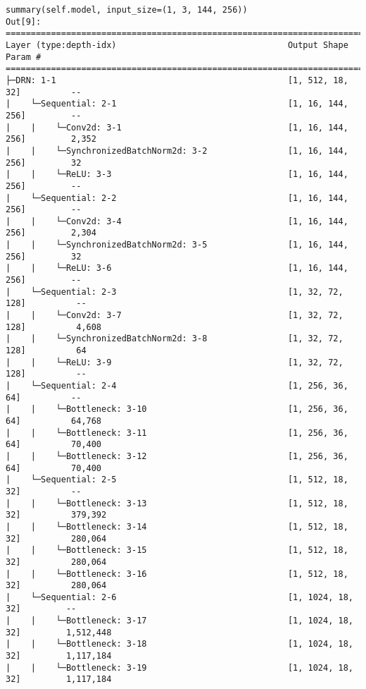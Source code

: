 \begin{verbatim}
summary(self.model, input_size=(1, 3, 144, 256))
Out[9]: 
=========================================================================================================
Layer (type:depth-idx)                                  Output Shape              Param #
=========================================================================================================
├─DRN: 1-1                                              [1, 512, 18, 32]          --
|    └─Sequential: 2-1                                  [1, 16, 144, 256]         --
|    |    └─Conv2d: 3-1                                 [1, 16, 144, 256]         2,352
|    |    └─SynchronizedBatchNorm2d: 3-2                [1, 16, 144, 256]         32
|    |    └─ReLU: 3-3                                   [1, 16, 144, 256]         --
|    └─Sequential: 2-2                                  [1, 16, 144, 256]         --
|    |    └─Conv2d: 3-4                                 [1, 16, 144, 256]         2,304
|    |    └─SynchronizedBatchNorm2d: 3-5                [1, 16, 144, 256]         32
|    |    └─ReLU: 3-6                                   [1, 16, 144, 256]         --
|    └─Sequential: 2-3                                  [1, 32, 72, 128]          --
|    |    └─Conv2d: 3-7                                 [1, 32, 72, 128]          4,608
|    |    └─SynchronizedBatchNorm2d: 3-8                [1, 32, 72, 128]          64
|    |    └─ReLU: 3-9                                   [1, 32, 72, 128]          --
|    └─Sequential: 2-4                                  [1, 256, 36, 64]          --
|    |    └─Bottleneck: 3-10                            [1, 256, 36, 64]          64,768
|    |    └─Bottleneck: 3-11                            [1, 256, 36, 64]          70,400
|    |    └─Bottleneck: 3-12                            [1, 256, 36, 64]          70,400
|    └─Sequential: 2-5                                  [1, 512, 18, 32]          --
|    |    └─Bottleneck: 3-13                            [1, 512, 18, 32]          379,392
|    |    └─Bottleneck: 3-14                            [1, 512, 18, 32]          280,064
|    |    └─Bottleneck: 3-15                            [1, 512, 18, 32]          280,064
|    |    └─Bottleneck: 3-16                            [1, 512, 18, 32]          280,064
|    └─Sequential: 2-6                                  [1, 1024, 18, 32]         --
|    |    └─Bottleneck: 3-17                            [1, 1024, 18, 32]         1,512,448
|    |    └─Bottleneck: 3-18                            [1, 1024, 18, 32]         1,117,184
|    |    └─Bottleneck: 3-19                            [1, 1024, 18, 32]         1,117,184

\end{verbatim}
